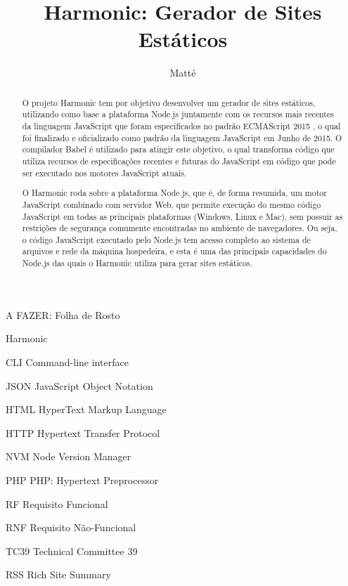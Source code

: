 \documentclass[ppginf, pep]{esinucpel}
\title{Harmonic: Gerador de Sites Estáticos}
\author{Matté}{Fabrício da Silva}
\begin{document}

\maketitle
\sloppy

\newpage

A FAZER: Folha de Rosto


\tableofcontents

\listoffigures

\listoftables

\begin{listofabbrv}{Harmonic}
    \item[CLI] Command-line interface
    \item[JSON] JavaScript Object Notation
    \item[HTML] HyperText Markup Language
    \item[HTTP] Hypertext Transfer Protocol
    \item[NVM] Node Version Manager
    \item[PHP] PHP: Hypertext Preprocessor
    \item[RF] Requisito Funcional
    \item[RNF] Requisito Não-Funcional
    \item[TC39] Technical Committee 39
    \item[RSS] Rich Site Summary
\end{listofabbrv}

\begin{abstract}

O projeto Harmonic tem por objetivo desenvolver um gerador de sites estáticos, utilizando como base a plataforma Node.js juntamente com os recursos mais recentes da linguagem JavaScript que foram especificados no padrão ECMAScript 2015 \cite{es2015}, o qual foi finalizado e oficializado como padrão da linguagem JavaScript em Junho de 2015. O compilador Babel é utilizado para atingir este objetivo, o qual transforma código que utiliza recursos de especificações recentes e futuras do JavaScript em código que pode ser executado nos motores JavaScript atuais.

O Harmonic roda sobre a plataforma Node.js, que é, de forma resumida, um motor JavaScript combinado com servidor Web, que permite execução do mesmo código JavaScript em todas as principais plataformas (Windows, Linux e Mac), sem possuir as restrições de segurança comumente encontradas no ambiente de navegadores. Ou seja, o código JavaScript executado pelo Node.js tem acesso completo ao sistema de arquivos e rede da máquina hospedeira, e esta é uma das principais capacidades do Node.js das quais o Harmonic utiliza para gerar sites estáticos.

\end{abstract}
\end{document}
